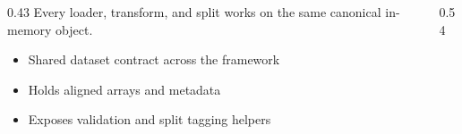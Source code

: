 \begin{frame}

  \vspace{14mm}
  \begin{columns}[T,onlytextwidth]
    \begin{column}{0.43\textwidth}
      {\small Every loader, transform, and split works on the same canonical in-memory object.}\par
      \vspace{1.5mm}
      \begin{itemize}
        \item Shared dataset contract across the framework
        \item Holds aligned arrays and metadata
        \item Exposes validation and split tagging helpers
      \end{itemize}
    \end{column}
    \begin{column}{0.54\textwidth}
      
    \end{column}
  \end{columns}

  \slideheaderfooter
\end{frame}
